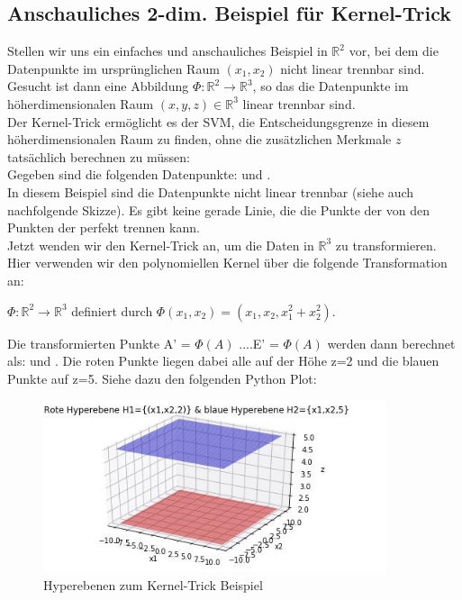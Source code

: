 \documentclass[12pt]{article}
\begin{document}
\subsection{Anschauliches 2-dim. Beispiel für Kernel-Trick}

Stellen wir uns ein einfaches und anschauliches Beispiel in $\mathbb{R}^2$ vor, bei dem die Datenpunkte im ursprünglichen Raum $(x_1,x_2)$ nicht linear trennbar sind.\\ 
Gesucht ist dann eine Abbildung $\Phi:\mathbb{R}^2 \rightarrow\mathbb{R}^3$, so das die Datenpunkte im höherdimensionalen Raum $(x,y,z)\in  \mathbb{R}^3$ linear trennbar sind.\\ 
Der Kernel-Trick ermöglicht es der SVM, die Entscheidungsgrenze in diesem höherdimensionalen Raum zu finden, ohne die zusätzlichen Merkmale $z$ tatsächlich berechnen zu müssen:\\ 
Gegeben sind die folgenden Datenpunkte: {\color{red}{Klasse +1: A(1,1), B(-1,1)}} und {\color{blue}{Klasse -1: C(2,1), D(1,-2) und E(-2,1)}}.\\
In diesem Beispiel sind die Datenpunkte nicht linear trennbar (siehe auch nachfolgende Skizze). Es gibt keine gerade Linie, die die Punkte der {\color{red}{Klasse +1}} von den Punkten der {\color{blue}{Klasse -1}} perfekt trennen kann.\\
Jetzt wenden wir den Kernel-Trick an, um die Daten in $\mathbb{R}^3$ zu transformieren. Hier verwenden wir den polynomiellen Kernel über die folgende Transformation an: 
\begin{center}
 $\Phi:\mathbb{R}^2 \rightarrow\mathbb{R}^3$ definiert durch  $\Phi(x_1,x_2) = (x_1,x_2, x_1^2 + x_2^2)$. 
\end{center} 
Die transformierten Punkte A' = $\Phi(A)$ ....E' = $\Phi(A)$ werden dann berechnet als: {\color{red}{Klasse +1: A'(1,1,2), B'(-1,1,2)}} und {\color{blue}{Klasse -1: C'(2,1,5), D'(1,-2,5) und E'(-2,1,5)}}. Die roten Punkte liegen dabei alle auf der Höhe z=2 und die blauen Punkte auf z=5. Siehe dazu den folgenden Python Plot:\\[0.2cm]

\newpage

\begin{figure}[ht]
  \centering
  \hspace*{-0.5cm} 
  \includegraphics[width=0.9\textwidth]{Kernel-Hyperebene-Bild}
  \caption{Hyperebenen zum Kernel-Trick Beispiel}
  \label{fig:SVM_Ebenen}
\end{figure}
\end{document}
